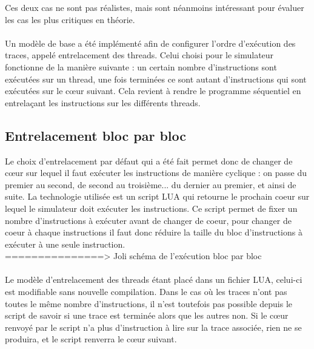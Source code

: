 Ces deux cas ne sont pas réalistes, mais sont néanmoins intéressant pour évaluer les cas les plus critiques en théorie.

\paragraph{}
Un modèle de base a été implémenté afin de configurer l'ordre d'exécution des traces, appelé entrelacement des threads. Celui choisi pour le simulateur fonctionne de la manière suivante : un certain nombre d'instructions sont exécutées sur un thread, une fois terminées ce sont autant d'instructions qui sont exécutées sur le c\oe ur suivant. Cela revient à rendre le programme  séquentiel en entrelaçant les instructions sur les différents threads.

\subsection{Entrelacement bloc par bloc}

Le choix d'entrelacement par défaut qui a été fait permet donc de changer de c\oe ur sur lequel il faut exécuter les instructions de manière cyclique : on passe du premier au second, de second au troisième... du dernier au premier, et ainsi de suite. La technologie utilisée est un script LUA qui retourne le prochain coeur sur lequel le simulateur doit exécuter les instructions. Ce script permet de fixer un nombre d'instructions à exécuter avant de changer de coeur, pour changer de coeur à chaque instructions il faut donc réduire la taille du bloc d'instructions à exécuter à une seule instruction.\\

===============> Joli schéma de l'exécution bloc par bloc

\paragraph{}
Le modèle d'entrelacement des threads étant placé dans un fichier LUA, celui-ci est modifiable sans nouvelle compilation. Dans le cas où les traces n'ont pas toutes le même nombre d'instructions, il n'est toutefois pas possible depuis le script de savoir si une trace est terminée alors que les autres non. Si le c\oe ur renvoyé par le script n'a plus d'instruction à lire sur la trace associée, rien ne se produira, et le script renverra le c\oe ur suivant. 


